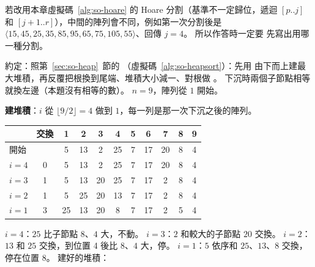若改用本章虛擬碼~\ref{alg:so-hoare} 的 Hoare 分割（基準不一定歸位，遞迴 $[p..j]$ 和
$[j+1..r]$），中間的陣列會不同，例如第一次分割後是
$\langle 15, 45, 25, 35, 85, 95, 65, 75, 105, 55 \rangle$、回傳 $j = 4$。 所以作答時一定要
先寫出用哪一種分割。

約定：照第~\ref{sec:so-heap}~節的 （虛擬碼~\ref{alg:so-heapsort}）：先用
 由下而上建最大堆積，再反覆把根換到尾端、堆積大小減一、對根做
。 下沉時兩個子節點相等就換左邊（本題沒有相等的數）。 $n = 9$，陣列從 $1$
開始。

\textbf{建堆積}：$i$ 從 $\lfloor 9/2 \rfloor = 4$ 做到 $1$，每一列是那一次下沉之後的陣列。
\begin{center}
\small
\begin{tabular}{lc*{9}{c}}
\toprule
& 交換 & 1 & 2 & 3 & 4 & 5 & 6 & 7 & 8 & 9 \\
\midrule
開始 & & 5 & 13 & 2 & 25 & 7 & 17 & 20 & 8 & 4 \\
$i = 4$ & 0 & 5 & 13 & 2 & 25 & 7 & 17 & 20 & 8 & 4 \\
$i = 3$ & 1 & 5 & 13 & 20 & 25 & 7 & 17 & 2 & 8 & 4 \\
$i = 2$ & 1 & 5 & 25 & 20 & 13 & 7 & 17 & 2 & 8 & 4 \\
$i = 1$ & 3 & 25 & 13 & 20 & 8 & 7 & 17 & 2 & 5 & 4 \\
\bottomrule
\end{tabular}
\end{center}
$i = 4$：$25$ 比子節點 $8$、$4$ 大，不動。 $i = 3$：$2$ 和較大的子節點 $20$ 交換。 $i = 2$：
$13$ 和 $25$ 交換，到位置 4 後比 $8$、$4$ 大，停。 $i = 1$：$5$ 依序和 $25$、$13$、$8$ 交換，
停在位置 8。 建好的堆積：

\begin{center}
\end{center}

